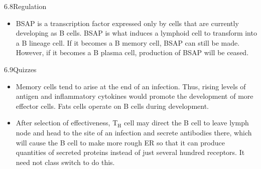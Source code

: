 \documentclass[UTF8]{book}
\begin{document}
6.8\quad Regulation
\begin{itemize}
\item BSAP is a transcription factor expressed only by cells that are currently developing as B cells. BSAP is what induces a lymphoid cell to transform into a B lineage cell. If it becomes a B memory cell, BSAP can still be made. However, if it becomes a B plasma cell, production of BSAP will be ceased.
\end{itemize}
6.9\quad Quizzes
\begin{itemize}
\item Memory cells tend to arise at the end of an infection. Thus, rising levels of antigen and inflammatory cytokines would promote the development of more effector cells. Fats cells operate on B cells during development.
\item After selection of effectiveness, T$_\mathrm{H}$ cell may direct the B cell to leave lymph node and head to the site of an infection and secrete antibodies there, which will cause the B cell to make more rough ER so that it can produce quantities of secreted proteins instead of just several hundred receptors. It need not class switch to do this.
\end{itemize}
\end{document}
